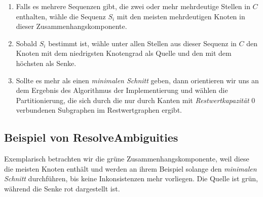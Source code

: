 \begin{enumerate}[topsep=0pt,itemsep=-1ex,partopsep=1ex,parsep=1ex]
	\item Falls es mehrere Sequenzen gibt, die zwei oder mehr mehrdeutige Stellen in $C$ enthalten, wähle die Sequenz $S_i$ mit den meisten mehrdeutigen Knoten in dieser Zusammenhangskomponente.
	\item Sobald $S_i$ bestimmt ist, wähle unter allen Stellen aus dieser Sequenz in $C$ den Knoten mit dem niedrigsten Knotengrad als Quelle und den mit dem höchsten als Senke.
	\item Sollte es mehr als einen \emph{minimalen Schnitt} geben, dann orientieren wir uns an dem Ergebnis des Algorithmus der Implementierung und wählen die Partitionierung, die sich durch die nur durch Kanten mit \emph{Restwertkapazität} 0 verbundenen Subgraphen im Restwertgraphen ergibt. 
\end{enumerate}

\subsection{Beispiel von \textrm{ResolveAmbiguities}}

Exemplarisch betrachten wir die grüne Zusammenhangskomponente, weil diese die meisten Knoten enthält und werden an ihrem Beispiel solange den \emph{minimalen Schnitt} durchführen, bis keine Inkonsistenzen mehr vorliegen. Die Quelle ist grün, während die Senke rot dargestellt ist.

